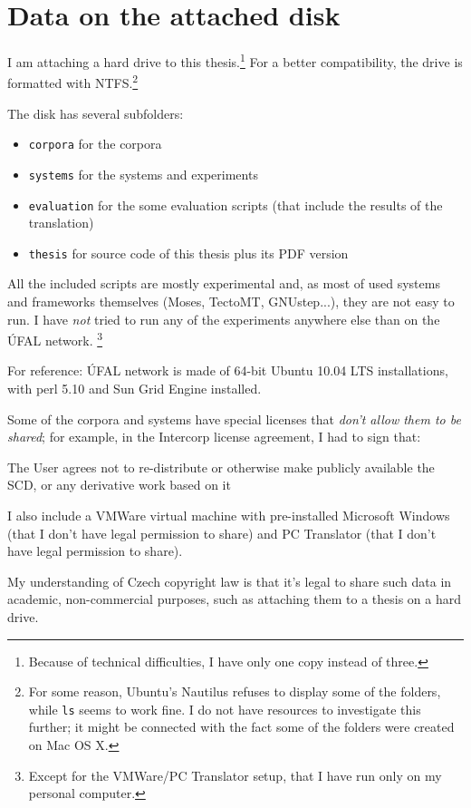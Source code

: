 \chapter{Data on the attached disk}

I am attaching a hard drive to this thesis.\footnote{Because of technical difficulties, I have only one copy instead of three.} For a better compatibility, the drive is formatted with NTFS.\footnote{For some reason, Ubuntu's Nautilus refuses to display some of the folders, while \texttt{ls} seems to work fine. I do not have resources to investigate this further; it might be connected with the fact some of the folders were created on Mac OS X.}

The disk has several subfolders:
\begin{itemize}
\item \texttt{corpora} for the corpora
\item \texttt{systems}  for the systems and experiments
\item \texttt{evaluation}  for the some evaluation scripts (that include the results of the translation)
\item \texttt{thesis} for \XeLaTeX source code of this thesis plus its PDF version
\end{itemize}

All the included scripts are mostly experimental and, as most of used systems and frameworks themselves (Moses, TectoMT, GNUstep...), they are not easy to run. I have \emph{not} tried to run any of the experiments anywhere else than on the ÚFAL network. \footnote{Except for the VMWare/PC Translator setup, that I have run only on my personal computer.}

For reference: ÚFAL network is made of 64-bit Ubuntu 10.04 LTS installations, with perl 5.10 and Sun Grid Engine installed.

Some of the corpora and systems have special licenses that \emph{don't allow them to be shared}; for example, in the Intercorp license agreement, I had to sign that:
\begin{quotee}The User agrees not to re-distribute or otherwise make publicly available the SCD, or any derivative work based on it\end{quotee}

I also include a VMWare virtual machine with pre-installed Microsoft Windows (that I don't have legal permission to share) and PC Translator (that I don't have legal permission to share). 

My understanding of Czech copyright law is that it's legal to share such data in academic, non-commercial purposes, such as attaching them to a thesis on a hard drive.

